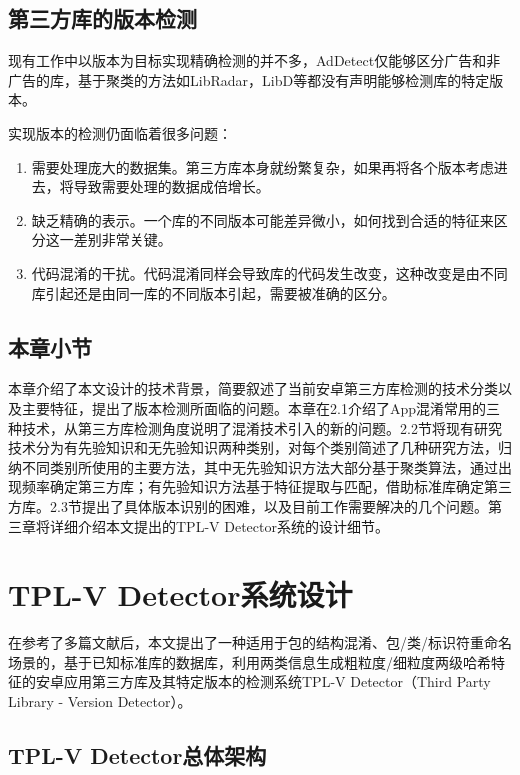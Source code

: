 \section{第三方库的版本检测}

现有工作中以版本为目标实现精确检测的并不多，AdDetect\cite{narayanan2014addetect}仅能够区分广告和非广告的库，基于聚类的方法如LibRadar\cite{ma2016libradar}，LibD\cite{li2017libd}等都没有声明能够检测库的特定版本。

实现版本的检测仍面临着很多问题：
\begin{enumerate}
\item{需要处理庞大的数据集。第三方库本身就纷繁复杂，如果再将各个版本考虑进去，将导致需要处理的数据成倍增长。}
\item{缺乏精确的表示。一个库的不同版本可能差异微小，如何找到合适的特征来区分这一差别非常关键。}
\item{代码混淆的干扰。代码混淆同样会导致库的代码发生改变，这种改变是由不同库引起还是由同一库的不同版本引起，需要被准确的区分。}
\end{enumerate}


\section{本章小节}
本章介绍了本文设计的技术背景，简要叙述了当前安卓第三方库检测的技术分类以及主要特征，提出了版本检测所面临的问题。本章在2.1介绍了App混淆常用的三种技术，从第三方库检测角度说明了混淆技术引入的新的问题。2.2节将现有研究技术分为有先验知识和无先验知识两种类别，对每个类别简述了几种研究方法，归纳不同类别所使用的主要方法，其中无先验知识方法大部分基于聚类算法，通过出现频率确定第三方库；有先验知识方法基于特征提取与匹配，借助标准库确定第三方库。2.3节提出了具体版本识别的困难，以及目前工作需要解决的几个问题。第三章将详细介绍本文提出的TPL-V Detector系统的设计细节。



\chapter{TPL-V Detector系统设计}

在参考了多篇文献后，本文提出了一种适用于包的结构混淆、包/类/标识符重命名场景的，基于已知标准库的数据库，利用两类信息生成粗粒度/细粒度两级哈希特征的安卓应用第三方库及其特定版本的检测系统TPL-V Detector（Third Party Library - Version Detector）。



\section{TPL-V Detector总体架构}

